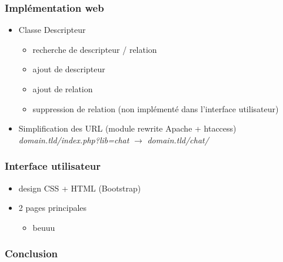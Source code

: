 \documentclass{beamer}
\begin{document}
\begin{frame}
\frametitle{Implémentation web}
\begin{itemize}
\item Classe Descripteur
\begin{itemize}
\item recherche de descripteur / relation
\item ajout de descripteur
\item ajout de relation
\item suppression de relation (non implémenté dans l'interface utilisateur)
\end{itemize}
\item Simplification des URL (module rewrite Apache + htaccess)\\ \emph{domain.tld/index.php?lib=chat} $\rightarrow$ \emph{domain.tld/chat/}
\end{itemize}
\end{frame}


\begin{frame}
\frametitle{Interface utilisateur}
\begin{itemize}
\item design CSS + HTML (Bootstrap)
\item 2 pages principales
\begin{itemize}
\item beuuu
\end{itemize}
\end{itemize}
\end{frame}


\begin{frame}
\frametitle{Conclusion}

\end{frame}
\end{document}
